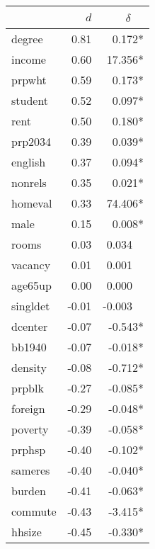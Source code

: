 \begin{tabular}{lrr}
	\toprule
	{}       &   $d$ & $\delta$~~ \\ \midrule
	degree   &  0.81 &   0.172* \\
	income   &  0.60 &  17.356* \\
	prpwht   &  0.59 &   0.173* \\
	student  &  0.52 &   0.097* \\
	rent     &  0.50 &   0.180* \\
	prp2034  &  0.39 &   0.039* \\
	english  &  0.37 &   0.094* \\
	nonrels  &  0.35 &   0.021* \\
	homeval  &  0.33 &  74.406* \\
	male     &  0.15 &   0.008* \\
	rooms    &  0.03 &  0.034~~ \\
	vacancy  &  0.01 &  0.001~~ \\
	age65up  &  0.00 &  0.000~~ \\
	singldet & -0.01 & -0.003~~ \\
	dcenter  & -0.07 &  -0.543* \\
	bb1940   & -0.07 &  -0.018* \\
	density  & -0.08 &  -0.712* \\
	prpblk   & -0.27 &  -0.085* \\
	foreign  & -0.29 &  -0.048* \\
	poverty  & -0.39 &  -0.058* \\
	prphsp   & -0.40 &  -0.102* \\
	sameres  & -0.40 &  -0.040* \\
	burden   & -0.41 &  -0.063* \\
	commute  & -0.43 &  -3.415* \\
	hhsize   & -0.45 &  -0.330* \\ \bottomrule
\end{tabular}

